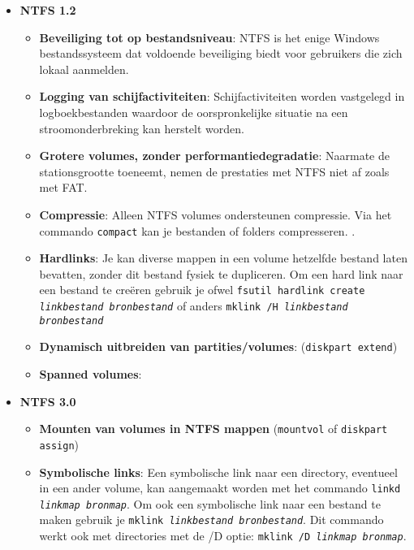 \begin{enumerate}
		 {
			\begin{itemize}
				\item \textbf{NTFS 1.2}
					\begin{itemize}
						\item \textbf{Beveiliging tot op bestandsniveau}: NTFS is het enige Windows bestandssysteem dat voldoende beveiliging biedt voor gebruikers die zich lokaal aanmelden.
						\item \textbf{Logging van schijfactiviteiten}: Schijfactiviteiten worden vastgelegd in logboekbestanden waardoor de oorspronkelijke situatie na een stroomonderbreking kan herstelt worden.
						\item \textbf{Grotere volumes, zonder performantiedegradatie}: Naarmate de stationsgrootte toeneemt, nemen de prestaties met NTFS niet af zoals met FAT.
						\item \textbf{Compressie}: Alleen NTFS volumes ondersteunen compressie. Via het commando \texttt{compact} kan je bestanden of folders compresseren. .
						\item \textbf{Hardlinks}: Je kan diverse mappen in een volume hetzelfde bestand laten bevatten, zonder dit bestand fysiek te dupliceren. Om een hard link naar een bestand te creëren gebruik je ofwel \texttt{fsutil hardlink create \emph{linkbestand} \emph{bronbestand}} of anders \texttt{mklink /H \emph{linkbestand} \emph{bronbestand}}
						\item \textbf{Dynamisch uitbreiden van partities/volumes}: (\texttt{diskpart extend})
						\item \textbf{Spanned volumes}: 
					\end{itemize}
				\item \textbf{NTFS 3.0}
					\begin{itemize}
						\item \textbf{Mounten van volumes in NTFS mappen} (\texttt{mountvol} of \texttt{diskpart assign})
						\item \textbf{Symbolische links}: Een symbolische link naar een directory, eventueel in een ander volume, kan aangemaakt worden met het commando \texttt{linkd \emph{linkmap} \emph{bronmap}}. Om ook een symbolische link naar een bestand te maken gebruik je \texttt{mklink \emph{linkbestand} \emph{bronbestand}}. Dit commando werkt ook met directories met de /D optie: \texttt{mklink /D \emph{linkmap} \emph{bronmap}}.

\end{itemize}
\end{itemize}}
\end{enumerate}
